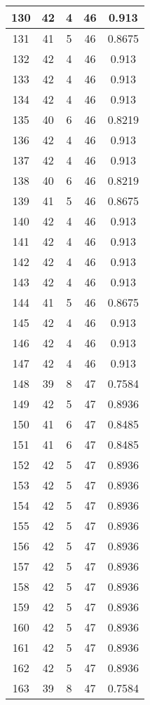 \documentclass[letterpaper, 12pt]{article}
\begin{document}
\begin{longtable}{|c|c|c|c|c|}
\hline
130 & 42 & 4 & 46 & 0.913 \\
\hline
131 & 41 & 5 & 46 & 0.8675 \\
\hline
132 & 42 & 4 & 46 & 0.913 \\
\hline
133 & 42 & 4 & 46 & 0.913 \\
\hline
134 & 42 & 4 & 46 & 0.913 \\
\hline
135 & 40 & 6 & 46 & 0.8219 \\
\hline
136 & 42 & 4 & 46 & 0.913 \\
\hline
137 & 42 & 4 & 46 & 0.913 \\
\hline
138 & 40 & 6 & 46 & 0.8219 \\
\hline
139 & 41 & 5 & 46 & 0.8675 \\
\hline
140 & 42 & 4 & 46 & 0.913 \\
\hline
141 & 42 & 4 & 46 & 0.913 \\
\hline
142 & 42 & 4 & 46 & 0.913 \\
\hline
143 & 42 & 4 & 46 & 0.913 \\
\hline
144 & 41 & 5 & 46 & 0.8675 \\
\hline
145 & 42 & 4 & 46 & 0.913 \\
\hline
146 & 42 & 4 & 46 & 0.913 \\
\hline
147 & 42 & 4 & 46 & 0.913 \\
\hline
148 & 39 & 8 & 47 & 0.7584 \\
\hline
149 & 42 & 5 & 47 & 0.8936 \\
\hline
150 & 41 & 6 & 47 & 0.8485 \\
\hline
151 & 41 & 6 & 47 & 0.8485 \\
\hline
152 & 42 & 5 & 47 & 0.8936 \\
\hline
153 & 42 & 5 & 47 & 0.8936 \\
\hline
154 & 42 & 5 & 47 & 0.8936 \\
\hline
155 & 42 & 5 & 47 & 0.8936 \\
\hline
156 & 42 & 5 & 47 & 0.8936 \\
\hline
157 & 42 & 5 & 47 & 0.8936 \\
\hline
158 & 42 & 5 & 47 & 0.8936 \\
\hline
159 & 42 & 5 & 47 & 0.8936 \\
\hline
160 & 42 & 5 & 47 & 0.8936 \\
\hline
161 & 42 & 5 & 47 & 0.8936 \\
\hline
162 & 42 & 5 & 47 & 0.8936 \\
\hline
163 & 39 & 8 & 47 & 0.7584 \\

\end{longtable}
\end{document}
